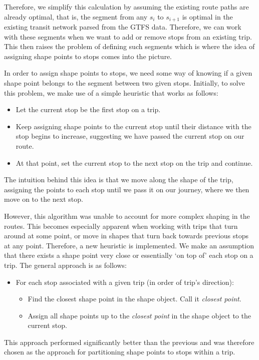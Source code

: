 \documentclass[11pt]{amsart}
\theoremstyle{definition}                  %
\theoremstyle{remark}                       %
\numberwithin{equation}{section}
\begin{document}
Therefore, we simplify this calculation by assuming the existing route paths are already optimal, that is, the segment from any $s_i$ to $s_{i+1}$ is optimal in the existing transit network parsed from the GTFS data. Therefore, we can work with these segments when we want to add or remove stops from an existing trip. This then raises the problem of defining such segments which is where the idea of assigning shape points to stops comes into the picture. 

In order to assign shape points to stops, we need some way of knowing if a given shape point belongs to the segment between two given stops. Initially, to solve this problem, we make use of a simple heuristic that works as follows:
\begin{itemize}
    \item Let the current stop be the first stop on a trip. 
    \item Keep assigning shape points to the current stop until their distance with the stop begins to increase, suggesting we have passed the current stop on our route.  
    \item At that point, set the current stop to the next stop on the trip and continue. 
\end{itemize}
The intuition behind this idea is that we move along the shape of the trip, assigning the points to each stop until we pass it on our journey, where we then move on to the next stop. 

However, this algorithm was unable to account for more complex shaping in the routes. This becomes especially apparent when working with trips that turn around at some point, or move in shapes that turn back towards previous stops at any point. Therefore, a new heuristic is implemented. We make an assumption that there exists a shape point very close or essentially `on top of' each stop on a trip. The general approach is as follows:
\begin{itemize}
    \item For each stop associated with a given trip (in order of trip's direction): 
    \begin{itemize}
        \item Find the closest shape point in the shape object. Call it \textit{closest point}.
        \item Assign all shape points up to the \textit{closest point} in the shape object to the current stop. 
    \end{itemize}
\end{itemize}
This approach performed significantly better than the previous and was therefore chosen as the approach for partitioning shape points to stops within a trip. 
\end{document}
